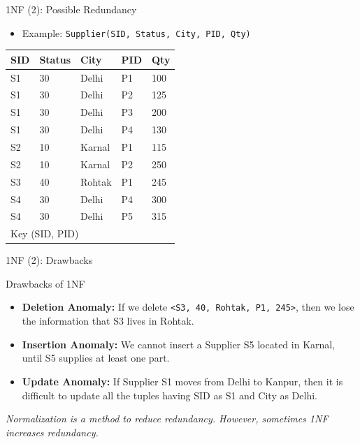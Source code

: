 \documentclass[aspectratio=169, xcolor=dvipsnames]{beamer}
\begin{document}
\begin{frame}{1NF (2): Possible Redundancy}
    \begin{itemize}
        \item Example: \texttt{Supplier(SID, Status, City, PID, Qty)}
    \end{itemize}
    \begin{table}
    \centering
    \begin{tabular}{lllll}
    \toprule
    \textbf{SID} & \textbf{Status} & \textbf{City} & \textbf{PID} & \textbf{Qty} \\
    \midrule
    S1 & 30 & Delhi & P1 & 100 \\
    S1 & 30 & Delhi & P2 & 125 \\
    S1 & 30 & Delhi & P3 & 200 \\
    S1 & 30 & Delhi & P4 & 130 \\
    S2 & 10 & Karnal & P1 & 115 \\
    S2 & 10 & Karnal & P2 & 250 \\
    S3 & 40 & Rohtak & P1 & 245 \\
    S4 & 30 & Delhi & P4 & 300 \\
    S4 & 30 & Delhi & P5 & 315 \\
    \bottomrule
    \multicolumn{5}{l}{\footnotesize Key (SID, PID)}
    \end{tabular}
    \end{table}
\end{frame}

\begin{frame}{1NF (2): Drawbacks}
    \begin{alertblock}{Drawbacks of 1NF}
        \begin{itemize}[<+->]
            \item \textbf{Deletion Anomaly:} If we delete \texttt{<S3, 40, Rohtak, P1, 245>}, then we lose the information that S3 lives in Rohtak.
            \item \textbf{Insertion Anomaly:} We cannot insert a Supplier S5 located in Karnal, until S5 supplies at least one part.
            \item \textbf{Update Anomaly:} If Supplier S1 moves from Delhi to Kanpur, then it is difficult to update all the tuples having SID as S1 and City as Delhi.
        \end{itemize}
    \end{alertblock}
    \vspace{0.5em}
    \textit{Normalization is a method to reduce redundancy. However, sometimes 1NF increases redundancy.}
\end{frame}
\end{document}
